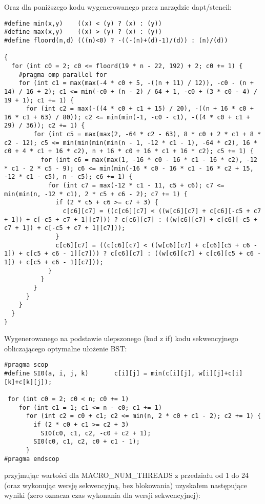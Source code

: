 \documentclass[a4paper,12pt]{scrartcl}
\begin{document}
Oraz dla poniższego kodu wygenerowanego przez narzędzie dapt/stencil:
\begin{lstlisting}
#define min(x,y)    ((x) < (y) ? (x) : (y))
#define max(x,y)    ((x) > (y) ? (x) : (y))
#define floord(n,d) (((n)<0) ? -((-(n)+(d)-1)/(d)) : (n)/(d))

{
  for (int c0 = 2; c0 <= floord(19 * n - 22, 192) + 2; c0 += 1) {
    #pragma omp parallel for
    for (int c1 = max(max(-4 * c0 + 5, -((n + 11) / 12)), -c0 - (n + 14) / 16 + 2); c1 <= min(-c0 + (n - 2) / 64 + 1, -c0 + (3 * c0 - 4) / 19 + 1); c1 += 1) {
      for (int c2 = max(-((4 * c0 + c1 + 15) / 20), -((n + 16 * c0 + 16 * c1 + 63) / 80)); c2 <= min(min(-1, -c0 - c1), -((4 * c0 + c1 + 29) / 36)); c2 += 1) {
        for (int c5 = max(max(2, -64 * c2 - 63), 8 * c0 + 2 * c1 + 8 * c2 - 12); c5 <= min(min(min(min(n - 1, -12 * c1 - 1), -64 * c2), 16 * c0 + 4 * c1 + 16 * c2), n + 16 * c0 + 16 * c1 + 16 * c2); c5 += 1) {
          for (int c6 = max(max(1, -16 * c0 - 16 * c1 - 16 * c2), -12 * c1 - 2 * c5 - 9); c6 <= min(min(-16 * c0 - 16 * c1 - 16 * c2 + 15, -12 * c1 - c5), n - c5); c6 += 1) {
            for (int c7 = max(-12 * c1 - 11, c5 + c6); c7 <= min(min(n, -12 * c1), 2 * c5 + c6 - 2); c7 += 1) {
              if (2 * c5 + c6 >= c7 + 3) {
                c[c6][c7] = ((c[c6][c7] < ((w[c6][c7] + c[c6][-c5 + c7 + 1]) + c[-c5 + c7 + 1][c7])) ? c[c6][c7] : ((w[c6][c7] + c[c6][-c5 + c7 + 1]) + c[-c5 + c7 + 1][c7]));
              }
              c[c6][c7] = ((c[c6][c7] < ((w[c6][c7] + c[c6][c5 + c6 - 1]) + c[c5 + c6 - 1][c7])) ? c[c6][c7] : ((w[c6][c7] + c[c6][c5 + c6 - 1]) + c[c5 + c6 - 1][c7]));
            }
          }
        }
      }
    }
  }
}
\end{lstlisting}

Wygenerowanego na podstawie ulepszonego (kod z if) kodu sekwencyjnego obliczającego optymalne ułożenie BST:
\begin{lstlisting}
#pragma scop
#define SI0(a, i, j, k)       c[i][j] = min(c[i][j], w[i][j]+c[i][k]+c[k][j]);

 for (int c0 = 2; c0 < n; c0 += 1)
    for (int c1 = 1; c1 <= n - c0; c1 += 1)
      for (int c2 = c0 + c1; c2 <= min(n, 2 * c0 + c1 - 2); c2 += 1) {
        if (2 * c0 + c1 >= c2 + 3)
          SI0(c0, c1, c2, -c0 + c2 + 1);
        SI0(c0, c1, c2, c0 + c1 - 1);
      }
#pragma endscop
\end{lstlisting}


przyjmując wartości dla MACRO\_NUM\_THREADS z przedziału od 1 do 24 (oraz wykonując wersję sekwencyjną, bez blokowania) uzyskałem następujące wyniki (zero oznacza czas wykonania dla wersji sekwencyjnej):
\end{document}

